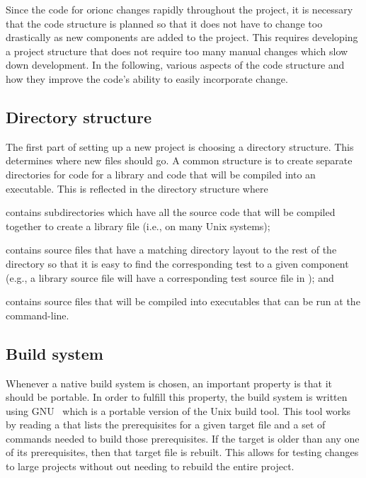 Since the code for \gls{orionc} changes rapidly throughout the project, it is
necessary that the code structure is planned so that it does not have
to change too drastically as new components are added to the project. This
requires developing a project structure that does not require too many manual
changes which slow down development. In the following, various aspects of the
code structure and how they improve the code's ability to easily incorporate change.

\subsection{Directory structure}

The first part of setting up a new project is choosing a directory structure.
This determines where new files should go. A common structure is to create
separate directories for code for a library and code that will be compiled into
an executable. This is reflected in the directory structure where
%
\begin{description}[font=\computertextfamily\textpluscolon]
\item[lib] contains subdirectories which have all the source code that will be
	compiled together to create a library file (i.e.,  on
	many Unix systems);
\item[lib/t] contains source files that have a matching directory layout to the
	rest of the  directory so that it is easy to find the corresponding test to a given component
	(e.g., a library source file  will have a
	corresponding test source file in ); and
\item[src] contains source files that will be compiled into executables that can be run at the command-line.
\end{description}

\subsection{Build system}

Whenever a native build system is chosen, an important property is that it
should be portable. In order to fulfill this property, the build system is
written using GNU~ which is a portable version of the Unix
 build tool. This tool works by reading a
 that lists the prerequisites for a given target file
and a set of commands needed to build those prerequisites. If the target is
older than any one of its prerequisites, then that target file is rebuilt. This
allows for testing changes to large projects without out needing to rebuild the
entire project.

